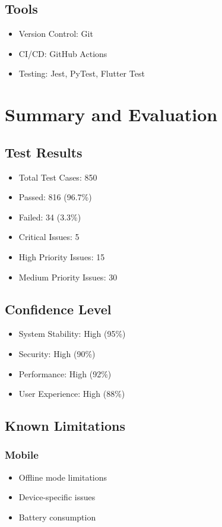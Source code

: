\subsection{Tools}
\begin{itemize}
    \item Version Control: Git
    \item CI/CD: GitHub Actions
    \item Testing: Jest, PyTest, Flutter Test
\end{itemize}

\section{Summary and Evaluation}

\subsection{Test Results}
\begin{itemize}
    \item Total Test Cases: 850
    \item Passed: 816 (96.7\%)
    \item Failed: 34 (3.3\%)
    \item Critical Issues: 5
    \item High Priority Issues: 15
    \item Medium Priority Issues: 30
\end{itemize}

\subsection{Confidence Level}
\begin{itemize}
    \item System Stability: High (95\%)
    \item Security: High (90\%)
    \item Performance: High (92\%)
    \item User Experience: High (88\%)
\end{itemize}

\subsection{Known Limitations}

\subsubsection{Mobile}
\begin{itemize}
    \item Offline mode limitations
    \item Device-specific issues
    \item Battery consumption
\end{itemize}

